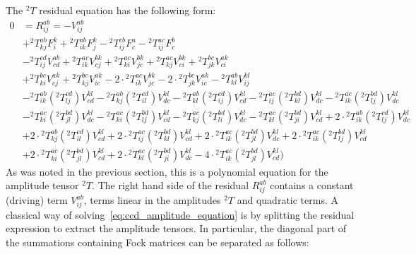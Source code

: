The ${}^2 T$ residual equation has the following form:
\begin{equation}
\begin{split}
0 & = R^{ab}_{ij} = -V^{ab}_{ij} \\
& + {}^{2}T^{ab}_{kj} F^{k}_{i} 
+ {}^{2}T^{ab}_{ik} F^{k}_{j}
- {}^{2}T^{cb}_{ij} F^{a}_{c} 
- {}^{2}T^{ac}_{ij} F^{b}_{c} \\
& - {}^{2}T^{cd}_{ij}  V^{ab}_{cd}
+ {}^{2}T^{ac}_{ik}  V^{bk}_{cj} 
+ {}^{2}T^{ac}_{ki}  V^{bk}_{jc} 
+ {}^{2}T^{ac}_{kj}  V^{bk}_{ci} 
+ {}^{2}T^{bc}_{jk}  V^{ak}_{ci}\\
&+ {}^{2}T^{bc}_{ki}  V^{ak}_{cj} 
+ {}^{2}T^{bc}_{kj}  V^{ak}_{ic}
- 2 \cdot {}^{2}T^{ac}_{ik}  V^{bk}_{jc}
- 2 \cdot {}^{2}T^{bc}_{jk}  V^{ak}_{ic}
- {}^{2} T^{ab}_{kl}  V^{kl}_{ij} \\
&- {}^{2} T^{ab}_{ik}  ({}^{2} T^{cd}_{lj})  V^{kl}_{cd} 
- {}^{2} T^{ab}_{kj}  ({}^{2} T^{cd}_{il}) V^{kl}_{dc}
- {}^{2} T^{ab}_{kl}  ({}^{2} T^{cd}_{ij}) V^{kl}_{cd}
- {}^{2} T^{ac}_{ij}  ({}^{2} T^{bd}_{kl})  V^{kl}_{dc}
-  {}^{2} T^{ac}_{ik}  ({}^{2} T^{bd}_{lj}) V^{kl}_{dc} \\
&- {}^{2} T^{ac}_{ki}  ({}^{2} T^{bd}_{jl}) V^{kl}_{dc}
- {}^{2} T^{ac}_{ki}  ({}^{2} T^{bd}_{lj}) V^{kl}_{cd}
- {}^{2} T^{ac}_{kj}  ({}^{2} T^{bd}_{li}) V^{kl}_{dc}
-  {}^{2} T^{ac}_{kl}  ({}^{2} T^{bd}_{ji}) V^{kl}_{cd}
+ 2 \cdot {}^{2} T^{ab}_{ik} ({}^{2} T^{cd}_{lj})  V^{kl}_{dc}\\
&+ 2 \cdot {}^{2} T^{ab}_{kj} ({}^{2} T^{cd}_{il})  V^{kl}_{cd}
+ 2 \cdot {}^{2} T^{ac}_{ij} ({}^{2} T^{bd}_{kl})  V^{kl}_{cd}
+ 2 \cdot {}^{2} T^{ac}_{ik} ({}^{2} T^{bd}_{jl})  V^{kl}_{dc}
+ 2 \cdot {}^{2} T^{ac}_{ik} ({}^{2} T^{bd}_{lj})  V^{kl}_{cd}\\  
&+ 2 \cdot {}^{2} T^{ac}_{ki} ({}^{2} T^{bd}_{jl})  V^{kl}_{cd}
+ 2 \cdot {}^{2} T^{ac}_{kl} ({}^{2} T^{bd}_{ji})  V^{kl}_{dc}
- 4 \cdot {}^{2} T^{ac}_{ik} ({}^{2} T^{bd}_{jl})  V^{kl}_{cd})
\end{split}
\label{eq:ccd_amplitude_equation}
\end{equation}  
As was noted in the previous section, this is a polynomial equation 
for the amplitude tensor ${}^2T$. The right hand side of the residual 
$R_{ij}^{ab}$ contains a constant (driving) term $V_{ij}^{ab}$, terms linear in 
the amplitudes ${}^2T$ and quadratic terms. A classical way of 
solving~\ref{eq:ccd_amplitude_equation} is by splitting the residual 
expression to extract the amplitude tensors. In particular, the diagonal part 
of the summations containing Fock matrices can be separated as follows:
